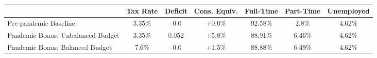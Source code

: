 \begin{center}
\begin{adjustbox}{width=\textwidth}
\begin{tabular}{lcccccc}\toprule
 & Tax Rate & Deficit & Cons. Equiv. & Full-Time & Part-Time & Unemployed \\
\midrule
Pre-pandemic Baseline & 3.35\% & -0.0 & +0.0\% & 92.58\% & 2.8\% & 4.62\% \\
Pandemic Bonus, Unbalanced Budget & 3.35\% & 0.052 & +5.8\% & 88.91\% & 6.46\% & 4.62\% \\
Pandemic Bonus, Balanced Budget & 7.6\% & -0.0 & +1.5\% & 88.88\% & 6.49\% & 4.62\% \\
\bottomrule\end{tabular}
\end{adjustbox}
\end{center}
